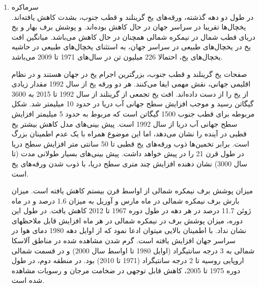 \begin{enumerate}
		
		
		
		
		
		
		
		
		
		
		
		
		
		
		
		
		
		
		\item  سرماکره\\
		در طول دو دهه گذشته، ورقه‌های یخ گرینلند و قطب جنوب، بشدت کاهش یافته‌اند. یخچال‌ها تقریبا در سراسر جهان در حال کاهش بوده‌اند. و پوشش برف بهار و یخ دریای قطب شمال در نیمکره شمالی همچنان در حال کاهش می‌باشد. میانگین افت یخ در یخچال‌های طبیعی در سراسر جهان، به استثنای یخچال‌های طبیعی در حاشیه یخچال‌های یخ، احتمالا 226 میلیون تن  در سال‌های 1971 تا 2009 می‌باشد. 
		
		صفحات یخ گرینلند و قطب جنوب، بزرگترین اجرام یخ در جهان هستند و در نظام اقلیمی جهانی، نقش مهمی ایفا می‌کنند. هر دو ورقه یخ از سال 1992 مقدار زیادی از یخ را از دست داده‌اند. افت یخ تجمعی از گرینلند از سال 1992 تا 2015 به 3600 گیگاتن رسید و موجب افزایش سطح جهانی آب دریا در حدود 10 میلیمتر شد. شکل مربوطه برای قطب جنوب 1500 گیگاتن است که مربوط به حدود 5 میلیمتر افزایش سطح جهانی آب دریا از سال 1992 است. پیش بینی‌های مدل کاهش بیشتر یخ قطبی در آینده را نشان می‌دهد، اما این موضوع همراه با یک عدم اطمینان بزرگ است. برابر تخمین‌ها ذوب ورقه‌های یخ قطبی تا 50 سانتی متر افزایش سطح دریا در طول قرن 21 را در پیش خواهد داشت. پیش بینی‌های بسیار طولانی مدت (تا سال 3000) نشان دهنده افزایش چند متری سطح دریا، با ذوب شدن ورقه‌های یخ است.
		
		میزان پوشش برف نیمکره شمالی از اواسط قرن بیستم کاهش یافته است. میزان بارش برف نیمکره شمالی در ماه مارس و آوریل به میزان 1.6 درصد و در ماه ژوئن 11.7 درصد در هر دهه در طول دوره 1967 تا 2012 کاهش یافت. در طول این دوره، میزان پوشش برف در نیمکره شمالی در هر ماه افزایش قابل ملاحظهای نشان نداد. با اطمینان بالایی میتوان ادعا نمود که از اوایل دهه 1980 دمای هوا در سراسر جهان افزایش یافته است. گرم شدن مشاهده شده در مناطق آلاسکا شمالی به 3 درجه سانتیگراد (اوایل 1980 تا اواسط سال 2000) و در قسمت شمالی اروپایی روسیه تا 2 درجه سانتیگراد (1971 تا 2010) بود. در منطقه دوم، در طول دوره 1975 تا 2005، کاهش قابل توجهی در ضخامت مرجان و رسوبات مشاهده شده است.
		

\end{enumerate}
